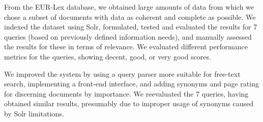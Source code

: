 \documentclass[sigconf, authorversion]{acmart}
\let\mainabsdir\theabsdir %
\begin{document}
From the EUR-Lex database, we obtained large amounts of data from which we chose a subset of documents with data as coherent and complete as possible. We indexed the dataset using Solr, formulated, tested and evaluated the results for 7 queries (based on previously defined information needs), and manually assessed the results for these in terms of relevance. We evaluated different performance metrics for the queries, showing decent, good, or very good scores.

We improved the system by using a query parser more suitable for free-text search, implementing a front-end interface, and adding synonyms and page rating for discerning documents by importance. We reevaluated the 7 queries, having obtained similar results, presumably due to improper usage of synonyms caused by Solr limitations.



\end{document}
